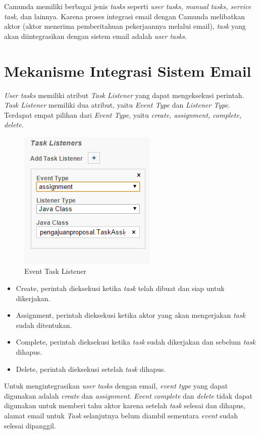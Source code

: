 Camunda memiliki berbagai jenis \textit{tasks} seperti \textit{user tasks, manual tasks, service task}, dan lainnya. Karena proses integrasi email dengan Camunda melibatkan aktor (aktor menerima pemberitahuan pekerjaannya melalui email), \textit{task} yang akan diintegrasikan dengan sistem email adalah \textit{user tasks}.

\section{Mekanisme Integrasi Sistem Email}
\label{integrasi}
\textit{User tasks} memiliki atribut \textit{Task Listener} yang dapat mengeksekusi perintah. \textit{Task Listener} memiliki dua atribut, yaitu \textit{Event Type} dan \textit{Listener Type}. Terdapat empat pilihan dari \textit{Event Type}, yaitu \textit{create, assignment, complete, delete}. 
		\begin{figure}[H]
			\centering
			\includegraphics[scale=1]{Gambar/Bab-3/TaskListener}
			\caption{Event Task Listener} 
			\label{fig:eventtasklistener}
		\end{figure}
\begin{itemize}
	\item Create, perintah dieksekusi ketika \textit{task} telah dibuat dan siap untuk dikerjakan. 
	\item Assignment, perintah dieksekusi ketika aktor yang akan mengerjakan \textit{task} sudah ditentukan.
	\item Complete, perintah dieksekusi ketika \textit{task} sudah dikerjakan dan sebelum \textit{task} dihapus.
	\item Delete, perintah dieksekusi setelah \textit{task} dihapus.
\end{itemize}


Untuk mengintegrasikan \textit{user tasks} dengan email, \textit{event type} yang dapat digunakan adalah \textit{create} dan \textit{assignment}. \textit{Event complete} dan \textit{delete} tidak dapat digunakan untuk memberi tahu aktor karena setelah \textit{task} selesai dan dihapus, alamat email untuk \textit{Task} selanjutnya belum diambil sementara \textit{event} sudah selesai dipanggil.

